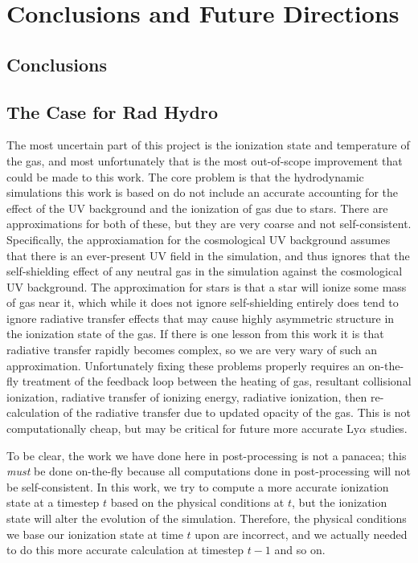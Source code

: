 \chapter{Conclusions and Future Directions}
\label{sec:discussion}

\section{Conclusions}
\label{sec:conclusions}


\section{The Case for Rad Hydro}

The most uncertain part of this project is the ionization state and temperature of the gas, and most unfortunately that is the most out-of-scope improvement that could be made to this work.
The core problem is that the hydrodynamic simulations this work is based on do not include an accurate accounting for the effect of the UV background and the ionization of gas due to stars.
There are approximations for both of these, but they are very coarse and not self-consistent.
Specifically, the approxiamation for the cosmological UV background assumes that there is an ever-present UV field in the simulation, and thus ignores that the self-shielding effect of any neutral gas in the simulation against the cosmological UV background.
The approximation for stars is that a star will ionize some mass of gas near it, which while it does not ignore self-shielding entirely does tend to ignore radiative transfer effects that may cause highly asymmetric structure in the ionization state of the gas.
If there is one lesson from this work it is that radiative transfer rapidly becomes complex, so we are very wary of such an approximation.
Unfortunately fixing these problems properly requires an on-the-fly treatment of the feedback loop between the heating of gas, resultant collisional ionization, radiative transfer of ionizing energy, radiative ionization, then re-calculation of the radiative transfer due to updated opacity of the gas.
This is not computationally cheap, but may be critical for future more accurate Ly$\alpha$ studies.

To be clear, the work we have done here in post-processing is not a panacea; this \emph{must} be done on-the-fly because all computations done in post-processing will not be self-consistent.
In this work, we try to compute a more accurate ionization state at a timestep $t$ based on the physical conditions at $t$, but the ionization state will alter the evolution of the simulation.
Therefore, the physical conditions we base our ionization state at time $t$ upon are incorrect, and we actually needed to do this more accurate calculation at timestep $t-1$ and so on.

